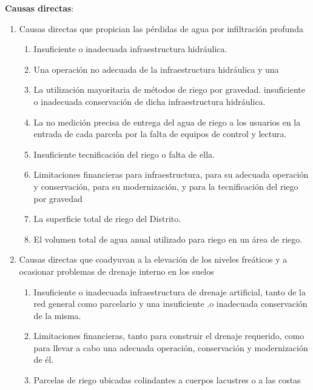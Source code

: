 \textbf{Causas directas}:
\begin{enumerate}
  \item Causas directas que propician las pérdidas de agua por infiltración profunda \begin{enumerate}
    \item Insuficiente o inadecuada infraestructura hidráulica.
    \item Una operación no adecuada de la infraestructura hidráulica y una
    \item La utilización mayoritaria de métodos de riego por gravedad. insuficiente o inadecuada conservación de dicha infraestructura hidráulica.
    \item La no medición precisa de entrega del agua de riego a los usuarios en la entrada de cada parcela por la falta de equipos de control y lectura.
    \item Insuficiente tecnificación del riego o falta de ella.
    \item Limitaciones financieras para infraestructura, para su adecuada operación y conservación, para su modernización, y para la tecnificación del riego por gravedad
    \item La superficie total de riego del Distrito.
    \item El volumen total de agua anual utilizado para riego en un área de riego.
  \end{enumerate}
  \item Causas directas que coadyuvan a la elevación de los niveles freáticos y a ocasionar problemas de drenaje interno en los suelos \begin{enumerate}
    \item Insuficiente o inadecuada infraestructura de drenaje artificial, tanto de la red general como parcelario y una insuficiente .o inadecuada conservación de la misma.
    \item Limitaciones financieras, tanto para construir el drenaje requerido, como para llevar a cabo una adecuada operación, conservación y modernización de él.
    \item Parcelas de riego ubicadas colindantes a cuerpos lacustres o a las costas
  \end{enumerate}
\end{enumerate}

